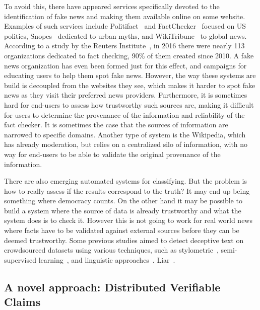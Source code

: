  To avoid this, there have appeared services specifically devoted to the identification of fake news and making them available online on some website. Examples of such services include Politifact~\cite{politifact} and FactChecker~\cite{factchecker} focused on US politics, Snopes~\cite{snopes} dedicated to urban myths, and WikiTribune~\cite{wikitribune} to global news. According to a study by the Reuters Institute~\cite{risefackchecking}, in 2016 there were nearly 113 organizations dedicated to fact checking, 90\% of them created since 2010. A fake news organization has even been formed just for this effect, and campaigns for educating users to help them spot fake news. However, the way these systems are build is decoupled from the websites they see, which makes it harder to spot fake news as they visit their preferred news providers. Furthermore, it is sometimes hard for end-users to assess how trustworthy such sources are, making it difficult for users to determine the provenance of the information and reliability of the fact checker. It is sometimes the case that the sources of information are narrowed to specific domains. Another type of system is the Wikipedia, which has already moderation, but relies on a centralized silo of information, with no way for end-users to be able to validate the original provenance of the information.

 There are also emerging automated systems for classifying. But the problem is how to really assess if the results correspond to the truth? It may end up being something where democracy counts. On the other hand it may be possible to build a system where the source of data is already trustworthy and what the system does is to check it. However this is not going to work for real world news where facts have to be validated against external sources before they can be deemed trustworthy. Some previous studies aimed to detect deceptive text on crowdsourced datasets using various techniques, such as stylometric~\cite{stylometric}, semi-supervised learning~\cite{semisupervised}, and linguistic approaches~\cite{linguistic}. Liar~\cite{liar}.


\subsection{A novel approach: Distributed Verifiable Claims}

